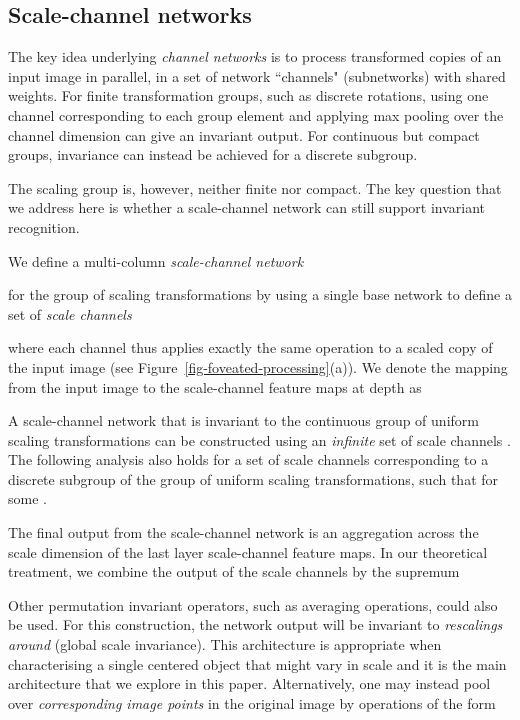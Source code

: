 \documentclass[twocolumn,runningheads]{svjour3}
\begin{document}
\subsection{Scale-channel networks}
\label{sec-scale-channel-networks}

The key idea underlying \emph{channel networks} is to process
transformed copies of an input image in parallel, in a set of network
``channels" (subnetworks) with shared weights. For finite
transformation groups, such as discrete rotations, using one channel
corresponding to each group element and applying max pooling over the
channel dimension can give an invariant output. For continuous
but compact groups, invariance can instead be achieved for a discrete
subgroup. 

The scaling group is, however, neither finite nor compact. The key question that we address here
is whether a scale-channel network can still support invariant
recognition. 

We define a multi-column {\em scale-channel network\/} 

for the group of scaling transformations  by using a single base 
network  to define a set of {\em scale channels\/} 

where each channel thus applies exactly the same operation to 
a scaled copy of the input image (see Figure~\ref{fig-foveated-processing}(a)). 
We denote the mapping from the input image to the scale-channel feature maps at depth  as 

A scale-channel network that is invariant to the continuous group of uniform scaling transformations  
can be constructed using an {\em infinite\/} set of scale channels . The following analysis also holds for a set of
scale channels corresponding to a discrete subgroup of the group of
uniform scaling transformations, such that 
 for some .

The final output  from the scale-channel network is an
aggregation across the scale dimension of the last layer scale-channel
feature maps. In our theoretical treatment, we combine the output of
the scale channels by the supremum

Other permutation invariant operators, such as averaging operations,
could also be used. For this construction, the network output will be
invariant to {\em rescalings around \/}
(global scale invariance). This architecture is appropriate  when
characterising a single centered object that might vary in scale and
it is the main architecture that we explore in this paper. 
Alternatively, one may instead pool over 
{\em corresponding image points\/} in the original image 
by operations of the form
\end{document}
